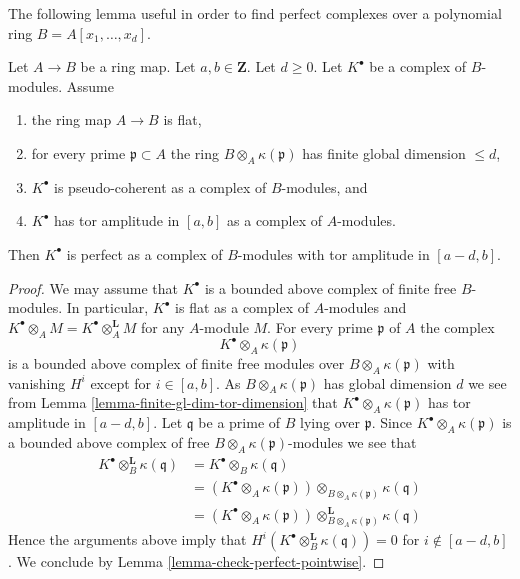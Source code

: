 \noindent
The following lemma useful in order to find perfect complexes
over a polynomial ring $B = A[x_1, \ldots, x_d]$.

\begin{lemma}
\label{lemma-perfect-over-polynomial-ring}
Let $A \to B$ be a ring map. Let $a, b \in \mathbf{Z}$. Let $d \geq 0$.
Let $K^\bullet$ be a complex of $B$-modules. Assume
\begin{enumerate}
\item the ring map $A \to B$ is flat,
\item for every prime $\mathfrak p \subset A$ the ring
$B \otimes_A \kappa(\mathfrak p)$ has finite global dimension $\leq d$,
\item $K^\bullet$ is pseudo-coherent as a complex of $B$-modules, and
\item $K^\bullet$ has tor amplitude in $[a, b]$ as a complex
of $A$-modules.
\end{enumerate}
Then $K^\bullet$ is perfect as a complex of $B$-modules
with tor amplitude in $[a - d, b]$.
\end{lemma}

\begin{proof}
We may assume that $K^\bullet$ is a bounded above complex of
finite free $B$-modules. In particular, $K^\bullet$ is flat as a
complex of $A$-modules and
$K^\bullet \otimes_A M = K^\bullet \otimes_A^{\mathbf{L}} M$ for any
$A$-module $M$. For every prime $\mathfrak p$ of $A$ the complex
$$
K^\bullet \otimes_A \kappa(\mathfrak p)
$$
is a bounded above complex of finite free modules over
$B \otimes_A \kappa(\mathfrak p)$ with vanishing $H^i$ except
for $i \in [a, b]$. As $B \otimes_A \kappa(\mathfrak p)$
has global dimension $d$ we see from
Lemma \ref{lemma-finite-gl-dim-tor-dimension}
that $K^\bullet \otimes_A \kappa(\mathfrak p)$ has tor amplitude in
$[a - d, b]$. Let $\mathfrak q$ be a prime of $B$ lying over $\mathfrak p$.
Since $K^\bullet \otimes_A \kappa(\mathfrak p)$ is a bounded above
complex of free $B \otimes_A \kappa(\mathfrak p)$-modules we see
that
\begin{align*}
K^\bullet \otimes_B^{\mathbf{L}} \kappa(\mathfrak q)
& = K^\bullet \otimes_B \kappa(\mathfrak q) \\
& = (K^\bullet \otimes_A \kappa(\mathfrak p))
\otimes_{B \otimes_A \kappa(\mathfrak p)} \kappa(\mathfrak q) \\
& = (K^\bullet \otimes_A \kappa(\mathfrak p))
\otimes^{\mathbf{L}}_{B \otimes_A \kappa(\mathfrak p)} \kappa(\mathfrak q)
\end{align*}
Hence the arguments above imply that
$H^i(K^\bullet \otimes_B^{\mathbf{L}} \kappa(\mathfrak q)) = 0$
for $i \not \in [a - d, b]$. We conclude by
Lemma \ref{lemma-check-perfect-pointwise}.
\end{proof}

